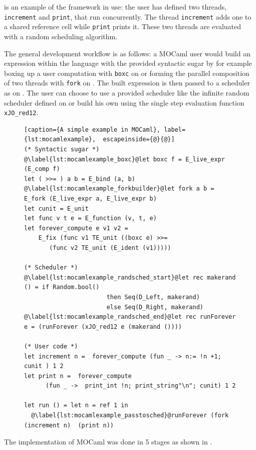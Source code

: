 \documentclass[12pt,twoside,notitlepage]{report}
\theoremstyle{plain}%
\theoremstyle{definition}
\theoremstyle{remark}
\begin{document}
 is an example of the framework in use:  the user has defined two threads, \lstinline|increment| and \lstinline|print|, that run concurrently. The thread  \lstinline|increment| adds one to a shared reference cell while \lstinline|print| prints it. These two threads are evaluated with a random scheduling algorithm.

The general development workflow is as follows: a MOCaml user would build an expression within the language with the provided syntactic sugar by for example boxing up a user computation with \lstinline|boxc| on  or forming the parallel composition of two threads with \lstinline|fork| on . The built expression is then passed to a scheduler as on . The user can choose to use a provided scheduler like the infinite random scheduler defined on  or build his own using the single step evaluation function \lstinline|xJO_red12|.
\begin{figure}[H]
\centering
\begin{lstlisting}[caption={A simple example in MOCaml}, label={lst:mocamlexample},  escapeinside={@}{@}]
(* Syntactic sugar *)
@\label{lst:mocamlexample_boxc}@let boxc f = E_live_expr (E_comp f)
let ( >>= ) a b = E_bind (a, b)
@\label{lst:mocamlexample_forkbuilder}@let fork a b = E_fork (E_live_expr a, E_live_expr b)
let cunit = E_unit
let func v t e = E_function (v, t, e)
let forever_compute e v1 v2 = 
    E_fix (func v1 TE_unit ((boxc e) >>= 
       (func v2 TE_unit (E_ident (v1)))))

(* Scheduler *)
@\label{lst:mocamlexample_randsched_start}@let rec makerand () = if Random.bool() 
                       then Seq(D_Left, makerand) 
                       else Seq(D_Right, makerand)
@\label{lst:mocamlexample_randsched_end}@let rec runForever e = (runForever (xJO_red12 e (makerand ())))

(* User code *)
let increment n =  forever_compute (fun _ -> n:= !n +1; cunit ) 1 2
let print n =  forever_compute 
      (fun _ ->  print_int !n; print_string"\n"; cunit) 1 2 

let run () = let n = ref 1 in
  @\label{lst:mocamlexample_passtosched}@runForever (fork (increment n)  (print n))
\end{lstlisting}
\end{figure}

The implementation of MOCaml was done in 5 stages as shown in . \label{sec:detailed_impl}
\end{document}
